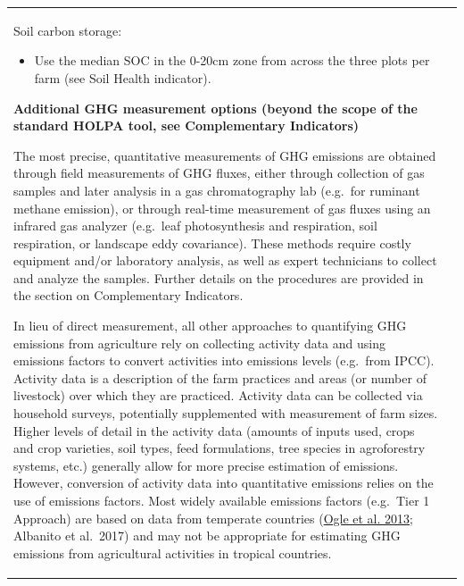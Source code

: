 \documentclass[
  letterpaper,
  DIV=11,
  numbers=noendperiod]{scrreprt}
\providecommand{\tightlist}{%
  \setlength{\itemsep}{0pt}\setlength{\parskip}{0pt}}
\begin{document}
\begin{longtable}[]{@{}
  >{\raggedright\arraybackslash}p{}
  >{\raggedright\arraybackslash}p{}@{}}
\begin{minipage}[t]{\linewidth}
Soil carbon storage:

\begin{itemize}
\tightlist
\item
  Use the median SOC in the 0-20cm zone from across the three plots per
  farm (see Soil Health indicator).
\end{itemize}

\textbf{Additional GHG measurement options (beyond the scope of the
standard HOLPA tool, see Complementary Indicators)}

The most precise, quantitative measurements of GHG emissions are
obtained through field measurements of GHG fluxes, either through
collection of gas samples and later analysis in a gas chromatography lab
(e.g.~for ruminant methane emission), or through real-time measurement
of gas fluxes using an infrared gas analyzer (e.g.~leaf photosynthesis
and respiration, soil respiration, or landscape eddy covariance). These
methods require costly equipment and/or laboratory analysis, as well as
expert technicians to collect and analyze the samples. Further details
on the procedures are provided in the section on Complementary
Indicators.

In lieu of direct measurement, all other approaches to quantifying GHG
emissions from agriculture rely on collecting activity data and using
emissions factors to convert activities into emissions levels (e.g.~from
IPCC). Activity data is a description of the farm practices and areas
(or number of livestock) over which they are practiced. Activity data
can be collected via household surveys, potentially supplemented with
measurement of farm sizes. Higher levels of detail in the activity data
(amounts of inputs used, crops and crop varieties, soil types, feed
formulations, tree species in agroforestry systems, etc.) generally
allow for more precise estimation of emissions. However, conversion of
activity data into quantitative emissions relies on the use of emissions
factors. Most widely available emissions factors (e.g.~Tier 1 Approach)
are based on data from temperate countries
(\href{https://onlinelibrary.wiley.com/doi/10.1111/gcb.12361}{Ogle et
al. 2013}; Albanito et al.~2017) and may not be appropriate for
estimating GHG emissions from agricultural activities in tropical
countries.


\end{minipage}
\end{longtable}
\end{document}
